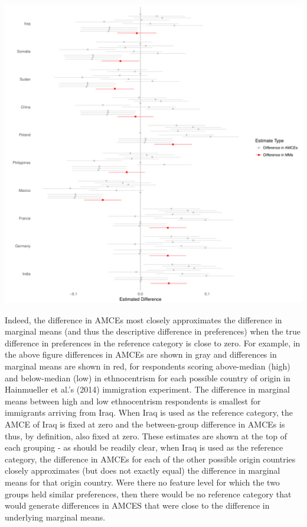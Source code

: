 \documentclass[a4paper,12pt]{article}\usepackage[]{graphicx}\usepackage[]{color}
\makeatletter
\def\maxwidth{ %
  \ifdim\Gin@nat@width>\linewidth
    \linewidth
  \else
    \Gin@nat@width
  \fi
}
\newenvironment{knitrout}{}{} %
\makeatother
\begin{document}
\begin{knitrout}
\color{fgcolor}
\includegraphics[width=\maxwidth]{figure/r_subgroup_results_mm-1} 

\end{knitrout}

Indeed, the difference in AMCEs most closely approximates the difference in marginal means (and thus the descriptive difference in preferences) when the true difference in preferences in the reference category is close to zero. For example, in the above figure differences in AMCEs are shown in gray and differences in marginal means are shown in red, for respondents scoring above-median (high) and below-median (low) in ethnocentrism for each possible country of origin in Hainmueller et al.'s (2014) immigration experiment. The difference in marginal means between high and low ethnocentrism respondents is smallest for immigrants arriving from Iraq. When Iraq is used as the reference category, the AMCE of Iraq is fixed at zero and the between-group difference in AMCEs is thus, by definition, also fixed at zero. These estimates are shown at the top of each grouping - as should be readily clear, when Iraq is used as the reference category, the difference in AMCEs for each of the other possible origin countries closely approximates (but does not exactly equal) the difference in marginal means for that origin country. Were there no feature level for which the two groups held similar preferences, then there would be no reference category that would generate differences in AMCES that were close to the difference in underlying marginal means.
\end{document}
